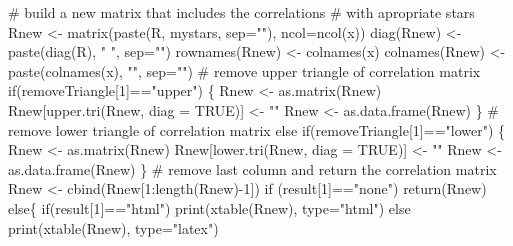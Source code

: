\documentclass[12pt,]{article}
\newenvironment{Shaded}{}{}
\newcommand{\KeywordTok}[1]{\textcolor[rgb]{0.00,0.00,1.00}{#1}}
\newcommand{\DataTypeTok}[1]{#1}
\newcommand{\DecValTok}[1]{#1}
\newcommand{\StringTok}[1]{\textcolor[rgb]{0.00,0.50,0.50}{#1}}
\newcommand{\CommentTok}[1]{\textcolor[rgb]{0.00,0.50,0.00}{#1}}
\newcommand{\OtherTok}[1]{\textcolor[rgb]{1.00,0.25,0.00}{#1}}
\newcommand{\ControlFlowTok}[1]{\textcolor[rgb]{0.00,0.00,1.00}{#1}}
\newcommand{\OperatorTok}[1]{#1}
\newcommand{\NormalTok}[1]{#1}
\begin{document}
\begin{Shaded}
\begin{Highlighting}[]
    \CommentTok{# build a new matrix that includes the correlations }
    \CommentTok{# with apropriate stars}
\NormalTok{    Rnew <-}\StringTok{ }\KeywordTok{matrix}\NormalTok{(}\KeywordTok{paste}\NormalTok{(R, mystars, }\DataTypeTok{sep=}\StringTok{""}\NormalTok{), }\DataTypeTok{ncol=}\KeywordTok{ncol}\NormalTok{(x))}
    \KeywordTok{diag}\NormalTok{(Rnew) <-}\StringTok{ }\KeywordTok{paste}\NormalTok{(}\KeywordTok{diag}\NormalTok{(R), }\StringTok{" "}\NormalTok{, }\DataTypeTok{sep=}\StringTok{""}\NormalTok{)}
    \KeywordTok{rownames}\NormalTok{(Rnew) <-}\StringTok{ }\KeywordTok{colnames}\NormalTok{(x)}
    \KeywordTok{colnames}\NormalTok{(Rnew) <-}\StringTok{ }\KeywordTok{paste}\NormalTok{(}\KeywordTok{colnames}\NormalTok{(x), }\StringTok{""}\NormalTok{, }\DataTypeTok{sep=}\StringTok{""}\NormalTok{)}
    \CommentTok{# remove upper triangle of correlation matrix}
    \ControlFlowTok{if}\NormalTok{(removeTriangle[}\DecValTok{1}\NormalTok{]}\OperatorTok{==}\StringTok{"upper"}\NormalTok{)}
\NormalTok{      \{}
\NormalTok{      Rnew <-}\StringTok{ }\KeywordTok{as.matrix}\NormalTok{(Rnew)}
\NormalTok{      Rnew[}\KeywordTok{upper.tri}\NormalTok{(Rnew, }\DataTypeTok{diag =} \OtherTok{TRUE}\NormalTok{)] <-}\StringTok{ ""}
\NormalTok{      Rnew <-}\StringTok{ }\KeywordTok{as.data.frame}\NormalTok{(Rnew)}
\NormalTok{      \}}
    \CommentTok{# remove lower triangle of correlation matrix}
    \ControlFlowTok{else} \ControlFlowTok{if}\NormalTok{(removeTriangle[}\DecValTok{1}\NormalTok{]}\OperatorTok{==}\StringTok{"lower"}\NormalTok{)}
\NormalTok{      \{}
\NormalTok{      Rnew <-}\StringTok{ }\KeywordTok{as.matrix}\NormalTok{(Rnew)}
\NormalTok{      Rnew[}\KeywordTok{lower.tri}\NormalTok{(Rnew, }\DataTypeTok{diag =} \OtherTok{TRUE}\NormalTok{)] <-}\StringTok{ ""}
\NormalTok{      Rnew <-}\StringTok{ }\KeywordTok{as.data.frame}\NormalTok{(Rnew)}
\NormalTok{      \}}
    \CommentTok{# remove last column and return the correlation matrix}
\NormalTok{    Rnew <-}\StringTok{ }\KeywordTok{cbind}\NormalTok{(Rnew[}\DecValTok{1}\OperatorTok{:}\KeywordTok{length}\NormalTok{(Rnew)}\OperatorTok{-}\DecValTok{1}\NormalTok{])}
    \ControlFlowTok{if}\NormalTok{ (result[}\DecValTok{1}\NormalTok{]}\OperatorTok{==}\StringTok{"none"}\NormalTok{) }\KeywordTok{return}\NormalTok{(Rnew)}
    \ControlFlowTok{else}\NormalTok{\{}
    \ControlFlowTok{if}\NormalTok{(result[}\DecValTok{1}\NormalTok{]}\OperatorTok{==}\StringTok{"html"}\NormalTok{) }\KeywordTok{print}\NormalTok{(}\KeywordTok{xtable}\NormalTok{(Rnew), }\DataTypeTok{type=}\StringTok{"html"}\NormalTok{)}
    \ControlFlowTok{else} \KeywordTok{print}\NormalTok{(}\KeywordTok{xtable}\NormalTok{(Rnew), }\DataTypeTok{type=}\StringTok{"latex"}\NormalTok{) }

\end{Highlighting}
\end{Shaded}
\end{document}
